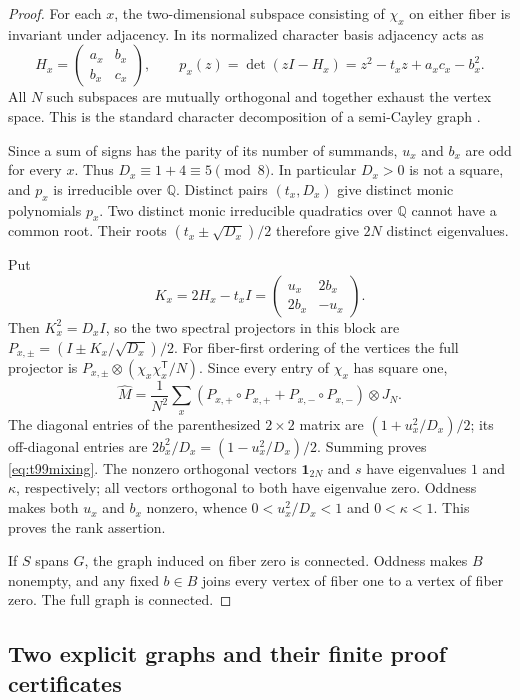 \documentclass[11pt,a4paper]{article}
\theoremstyle{definition}
\theoremstyle{remark}
\begin{document}
\begin{proof}
For each $x$, the two-dimensional subspace consisting of $\chi_x$ on
either fiber is invariant under adjacency. In its normalized character
basis adjacency acts as
\[
 H_x=\begin{pmatrix}a_x&b_x\\b_x&c_x\end{pmatrix},\qquad
 p_x(z)=\det(zI-H_x)=z^2-t_xz+a_xc_x-b_x^2.
\]
All $N$ such subspaces are mutually orthogonal and together exhaust the
vertex space. This is the standard character decomposition of a
semi-Cayley graph \cite{t99gl2010}.

Since a sum of signs has the parity of its number of summands, $u_x$ and
$b_x$ are odd for every $x$. Thus
$D_x\equiv1+4\equiv5\pmod8$. In particular $D_x>0$ is not a square,
and $p_x$ is irreducible over $\mathbb Q$. Distinct pairs $(t_x,D_x)$
give distinct monic polynomials $p_x$. Two distinct monic irreducible
quadratics over $\mathbb Q$ cannot have a common root. Their roots
$(t_x\pm\sqrt{D_x})/2$ therefore give $2N$ distinct eigenvalues.

Put
\[
 K_x=2H_x-t_xI=\begin{pmatrix}u_x&2b_x\\2b_x&-u_x\end{pmatrix}.
\]
Then $K_x^2=D_xI$, so the two spectral projectors in this block are
$P_{x,\pm}=(I\pm K_x/\sqrt{D_x})/2$.
For fiber-first ordering of the vertices the full projector is
$P_{x,\pm}\otimes(\chi_x\chi_x^{\mathsf T}/N)$.
Since every entry of $\chi_x$ has square one,
\[
 \widehat M=\frac1{N^2}\sum_x
 (P_{x,+}\circ P_{x,+}+P_{x,-}\circ P_{x,-})\otimes J_N.
\]
The diagonal entries of the parenthesized $2\times2$ matrix are
$(1+u_x^2/D_x)/2$; its off-diagonal entries are
$2b_x^2/D_x=(1-u_x^2/D_x)/2$.
Summing proves \eqref{eq:t99mixing}. The nonzero orthogonal vectors
$\mathbf1_{2N}$ and $s$ have eigenvalues $1$ and $\kappa$, respectively;
all vectors orthogonal to both have eigenvalue zero. Oddness makes both
$u_x$ and $b_x$ nonzero, whence $0<u_x^2/D_x<1$ and $0<\kappa<1$.
This proves the rank assertion.

If $S$ spans $G$, the graph induced on fiber zero is connected.
Oddness makes $B$ nonempty, and any fixed $b\in B$ joins every vertex
of fiber one to a vertex of fiber zero. The full graph is connected.
\end{proof}

\subsection{Two explicit graphs and their finite proof certificates}
\end{document}
